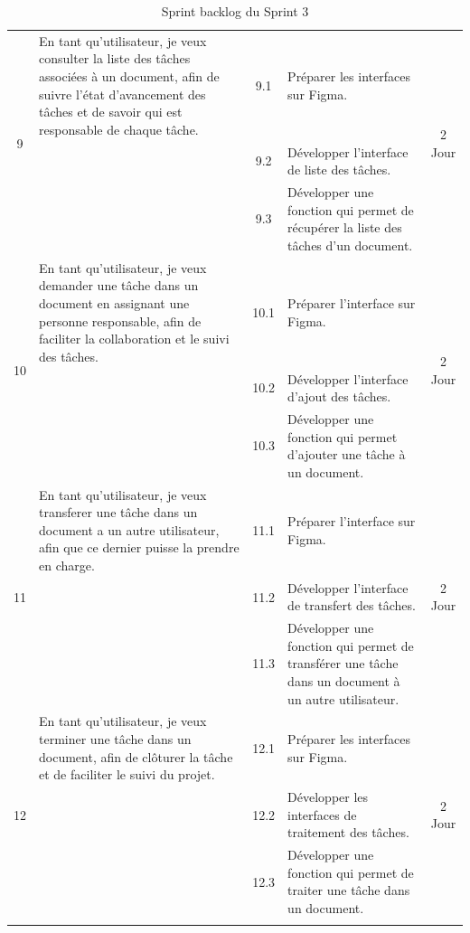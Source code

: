 \begin{adjustwidth}{-1cm}{}
\begin{longtable}{|c|p{6cm}|c|p{6cm}|c|}
      \cline{1-5}
      \multirow{3}{*}{9} & En tant qu'utilisateur, je veux consulter la liste des tâches associées à un document, afin de suivre l'état d'avancement des tâches et de savoir qui est responsable de chaque tâche. & 9.1 & Préparer les interfaces sur Figma. & \multirow{3}{*}{2 Jour} \\
      \cline{3-4}
      & & 9.2 & Développer l'interface de liste des tâches. & \\
      \cline{3-4}
      & & 9.3 & Développer une fonction qui permet de récupérer la liste des tâches d'un document. & \\
      \cline{1-5}
      \multirow{3}{*}{10} & En tant qu'utilisateur, je veux demander une tâche dans un document en assignant une personne responsable, afin de faciliter la collaboration et le suivi des tâches. & 10.1 & Préparer l'interface sur Figma. & \multirow{3}{*}{2 Jour} \\
      \cline{3-4}
      & & 10.2 & Développer l'interface d'ajout des tâches. & \\
      \cline{3-4}
      & & 10.3 & Développer une fonction qui permet d'ajouter une tâche à un document. & \\
      \cline{1-5}
      \multirow{3}{*}{11} & En tant qu'utilisateur, je veux transferer une tâche dans un document a un autre utilisateur, afin que ce dernier puisse la prendre en charge. & 11.1 & Préparer l'interface sur Figma. & \multirow{3}{*}{2 Jour} \\
      \cline{3-4}
      & & 11.2 & Développer l'interface de transfert des tâches. & \\
      \cline{3-4}
      & & 11.3 & Développer une fonction qui permet de transférer une tâche dans un document à un autre utilisateur. & \\
      \cline{1-5}
      \multirow{3}{*}{12} &En tant qu'utilisateur, je veux terminer une tâche dans un document, afin de clôturer la tâche et de faciliter le suivi du projet. & 12.1 & Préparer les interfaces sur Figma. & \multirow{3}{*}{2 Jour} \\
      \cline{3-4}
      & & 12.2 & Développer les interfaces de traitement des tâches. & \\
      \cline{3-4}
      & & 12.3 & Développer une fonction qui permet de traiter une tâche dans un document. & \\
      \cline{1-5}
  \hline
  \caption{Sprint backlog du Sprint 3}
  \label{tab:sprint-backlog-3}
\end{longtable}
\end{adjustwidth}



